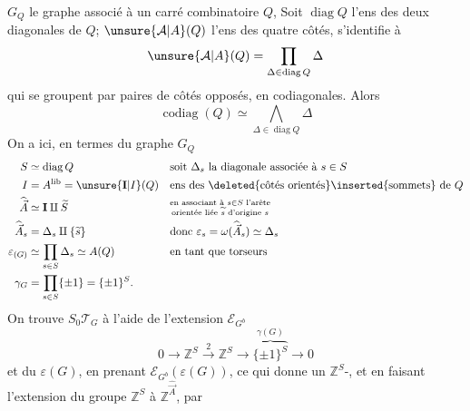 $G_Q$ le graphe associé à un carré combinatoire $Q$,
Soit $\operatorname{diag}Q$ l'ens des deux diagonales de $Q$; $\unsure{\mathcal A|A}(Q)$ l'ens des quatre côtés, s'identifie à
\[
\unsure{\mathcal A|A}(Q)=\prod_{\Delta\in\operatorname{diag}Q}\Delta
\]
 qui se groupent  par paires de côtés opposés, en codiagonales. Alors
\[
\operatorname{codiag}(Q)\simeq\bigwedge_{\Delta\in\operatorname{diag}Q}\Delta
\]
On a ici, en termes du graphe $G_Q$
\[
\begin{aligned}
S&\simeq\operatorname{diag}Q&&\text{soit }\Delta_s\text{ la diagonale associée à }s\in S\\
I&=A^{\mathrm{lib}}=\unsure{\mathbf I|I}(Q)&&\text{ens des }\deleted{\text{côtés orientés}}\inserted{\text{sommets}}\text{ de }Q\\
\widehat{\vec A}&\simeq\mathbf I\amalg\widetilde S&&\substack{\text{en associant à }s\in S\text{ l'arête}\\\text{orientée liée }\widetilde s\text{ d'origine }s}\\
\widehat{\vec A}_s&=\Delta_s\amalg\{\widetilde s\}&&\text{donc }\varepsilon_s=\omega(\widehat{\vec A}_s)\simeq\Delta_s\\
\varepsilon_{(G)}&\simeq\prod_{s\in S}\Delta_s\simeq A(Q)&&\text{en tant que torseurs}\\
\gamma_G&=\prod_{s\in S}\{\pm1\}=\{\pm1\}^{S}.&&
\end{aligned}
\]
On trouve $S_0\mathcal T_G$ à l'aide de l'extension $\mathcal E_{G^b}$
\[
0\longrightarrow\mathbb Z^S\xrightarrow{2}\mathbb Z^S\longrightarrow\overbrace{\{\pm1\}^S}^{\gamma(G)}\longrightarrow0
\]
et du  $\varepsilon(G)$, en prenant $\mathcal E_{G^b}(\varepsilon(G))$, ce qui donne un $\mathbb Z^S$-, et en faisant l'extension du groupe  $\mathbb Z^S$ à $\mathbb Z^{\widehat{\vec A}}$, par

